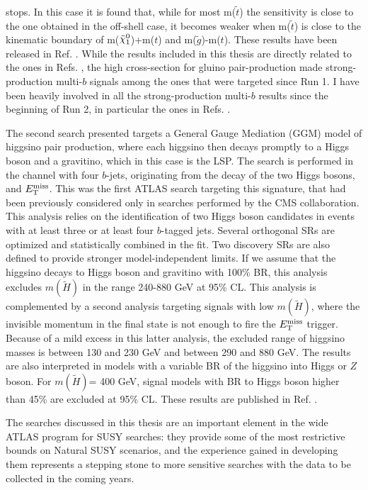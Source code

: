 \documentclass[11pt,a4paper]{article}
\newcommand{\met}{\ensuremath{E_{\rm T}^{\mathrm{miss}}}\xspace}
\newcommand*{\gluino}{\ensuremath{\tilde{g}}\xspace}
\def\mhino{\ensuremath{m(\tilde{H})}\xspace}
\newcommand*{\ninoone}{\ensuremath{\mathchoice%
      {\displaystyle\raise.4ex\hbox{$\displaystyle\tilde\chi^0_1$}}%
         {\textstyle\raise.4ex\hbox{$\textstyle\tilde\chi^0_1$}}%
       {\scriptstyle\raise.3ex\hbox{$\scriptstyle\tilde\chi^0_1$}}%
 {\scriptscriptstyle\raise.3ex\hbox{$\scriptscriptstyle\tilde\chi^0_1$}}}\xspace}
\begin{document}
stops. In this case it is found that, while for most m($\tilde{t}$) the sensitivity 
is close to the one obtained in the off-shell case, it becomes weaker 
when m($\tilde{t}$) is close to the kinematic boundary of 
m(\ninoone)+m($t$) and m(\gluino)-m($t$).  
These results have been released in Ref. \cite{ATLAS-CONF-2018-041}. 
While the results included in this thesis are directly related to the ones in Refs. \cite{Aaboud:2017hrg,ATLAS-CONF-2018-041}, 
the high cross-section for gluino pair-production made strong-production multi-$b$ signals among the ones that were targeted since Run 1. 
I have been heavily involved in all the strong-production multi-$b$ results since the beginning of Run 2, in particular the ones in Refs. \cite{Aad:2016eki,ATLAS-CONF-2016-052}. 


The second search presented targets a General Gauge Mediation (GGM) model of higgsino pair production, where each higgsino then 
decays promptly to a Higgs boson and 
a gravitino, which in this case is the LSP. 
The search is performed in the channel with four $b$-jets, originating from 
the decay of the two Higgs bosons, and \met. 
This was the first ATLAS search targeting this signature, that had been 
previously considered only in searches performed by the CMS collaboration.
This analysis relies on the identification of two Higgs boson candidates in events with at least three or 
at least four $b$-tagged jets. Several orthogonal SRs are optimized and statistically combined in the fit. 
Two discovery SRs are also defined to provide stronger model-independent limits. 
If we assume that the higgsino decays to Higgs boson and gravitino with 100\% BR, 
this analysis excludes \mhino in the range 240-880 GeV at 95\% CL. 
This analysis is complemented by a second analysis targeting signals with low \mhino, where the 
invisible momentum in the final state is not enough to fire the \met trigger. 
Because of a mild excess in this latter analysis, the excluded range of higgsino masses is 
between 130 and 230 GeV and between 290 and 880 GeV.
The results are also interpreted in models with a variable BR of the higgsino into Higgs or $Z$ boson. 
For \mhino = 400 GeV, signal models with BR to Higgs boson higher than 45\% are 
excluded at 95\% CL.
These results are published in Ref. \cite{Aaboud:2018htj}. 


The searches discussed in this thesis are an important element in the wide ATLAS program 
for SUSY searches: they  
provide some of the most restrictive bounds on Natural SUSY scenarios, 
and the experience gained in developing them represents a stepping stone to more sensitive searches 
with the data to be collected in the coming years.
\end{document}
